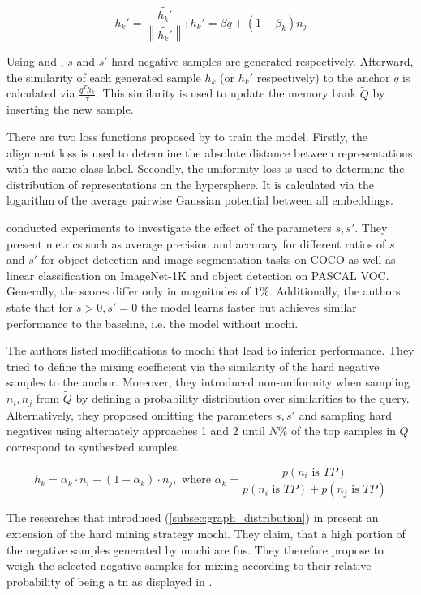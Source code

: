 \begin{equation}
    h_k' = \frac{\tilde{h_k'}}{\left\| \tilde{h_k'}  \right\|}; \tilde{h_k'} = \beta q + (1-\beta_k)n_j
    \label{eq:mochi_appr2}
\end{equation}

Using  and , 
$s$ and $s'$ hard negative samples are generated respectively.
Afterward, the similarity of each generated sample $h_k$ (or $h_k'$ respectively) 
to the anchor $q$ is calculated via $\frac{q^T h_k}{\tau}$.
This similarity is used to update the memory bank $\tilde{Q}$ 
by inserting the new sample.

There are two loss functions proposed by \citet{mochi_2020} to train the model.
Firstly, the alignment loss is used to determine 
the absolute distance between representations with the same class label.
Secondly, the uniformity loss is used to determine 
the distribution of representations on the hypersphere.
It is calculated via the logarithm of the average pairwise Gaussian potential between all embeddings.

\citet{mochi_2020} conducted experiments to investigate the effect of the parameters $s, s'$.
They present metrics such as average precision and accuracy for different ratios of $s$ and $s'$ 
for object detection and image segmentation tasks on COCO as well as 
linear classification on ImageNet-1K and object detection on PASCAL VOC.
Generally, the scores differ only in magnitudes of $1 \%$.
Additionally, the authors state that for $s > 0, s' = 0$ the model learns faster but achieves similar performance to the baseline, i.e. the model without \ac{mochi}.


The authors listed modifications to \ac{mochi} that lead to inferior performance.
They tried to define the mixing coefficient via the similarity of the hard negative samples 
to the anchor. %
Moreover, they introduced non-uniformity when sampling $n_i, n_j$ from $\tilde{Q}$ by defining a 
probability distribution over similarities to the query. %
Alternatively, they proposed omitting the parameters $s, s'$ and 
sampling hard negatives using alternately approaches 1 and 2 until $N\%$ of the top samples in 
$\tilde{Q}$ correspond to synthesized samples.

\begin{equation}
    \tilde{h_k} =  \alpha_k \cdot n_i + (1-\alpha_k) \cdot  n_j, \text{ where } \alpha_k = \frac{p(n_i \text{ is } TP)}{p(n_i \text{ is } TP) + p(n_j \text{ is } TP)}
    \label{eq:progcl_mix}
\end{equation}

The researches that introduced \progcl{} (\autoref{subsec:graph_distribution}) in \citet{progcl_2022} 
present an extension of the hard mining strategy \ac{mochi}.%
They claim, that a high portion of the negative samples generated by \ac{mochi} are \acp{fn}.
They therefore propose to weigh the selected negative samples for mixing 
according to their relative probability of being a \ac{tn} as displayed in .
